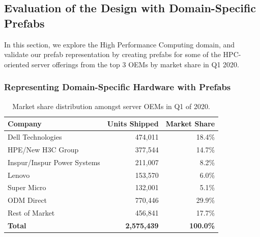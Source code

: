 \documentclass[11pt]{article}
\begin{document}
	\subsection{Evaluation of the Design with Domain-Specific Prefabs}
		In this section, we explore the High Performance Computing domain, and validate our prefab representation by creating prefabs for some of the HPC-oriented server offerings from the top 3 OEMs by market share in Q1 2020.
	
		\subsubsection{Representing Domain-Specific Hardware with Prefabs}
			\begin{table}[]
			\centering
				\begin{tabular}{lrr}
				\toprule
				Company                     & Units Shipped      & Market Share     \\ \midrule
				\rowcolor[HTML]{9AFF99} 
				Dell Technologies           & 474,011            & 18.4\%           \\
				\rowcolor[HTML]{9AFF99} 
				HPE/New H3C Group           & 377,544            & 14.7\%           \\
				\rowcolor[HTML]{9AFF99} 
				Inspur/Inspur Power Systems & 211,007            & 8.2\%            \\
				Lenovo                      & 153,570            & 6.0\%            \\
				Super Micro                 & 132,001            & 5.1\%            \\
				ODM Direct                  & 770,446            & 29.9\%           \\
				Rest of Market              & 456,841            & 17.7\%           \\ \midrule
				\textbf{Total}              & \textbf{2,575,439} & \textbf{100.0\%} \\ \bottomrule
				\end{tabular}
			\caption[Market share distribution amongst server OEMs in Q1 of 2020]{Market share distribution amongst server OEMs in Q1 of 2020.}
			\label{tab:1}
			\end{table}
\end{document}
